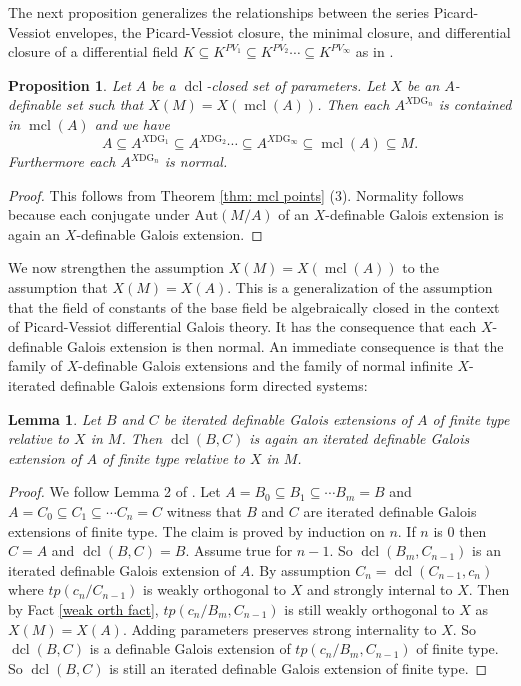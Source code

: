 \documentclass{amsart}
\newtheorem{proposition}[theorem]{Proposition}
\newtheorem{lemma}[theorem]{Lemma}
\theoremstyle{definition}
\theoremstyle{remark}
\numberwithin{equation}{section}
\def \tp {tp}
\def \aut {\text{Aut}}
\def \mcl {\operatorname{mcl}}
\def \dcl {\operatorname{dcl}}
\begin{document}
The next proposition generalizes the relationships between the series Picard-Vessiot envelopes, the Picard-Vessiot closure, the minimal closure, and differential closure of a differential field $K \subseteq K^{PV_1} \subseteq K^{PV_2}  \cdots \subseteq  K^{PV_\infty}$ as in \cite{meretzky2026galoistheoryautomorphismgroups}. 

\begin{proposition}\label{prop: struct of M}
    Let $A$ be a $\dcl$-closed set of parameters. Let $X$ be an $A$-definable set such that $X(M) = X(\mcl(A))$. Then each $A^{X\text{DG}_n}$ is contained in $\mcl(A)$ and we have $$A \subseteq A^{X\text{DG}_1} \subseteq A^{X\text{DG}_2} \cdots \subseteq A^{X\text{DG}_\infty} \subseteq \mcl(A) \subseteq M.$$ Furthermore each $A^{X\text{DG}_n}$ is normal. 
\end{proposition}

\begin{proof}
    This follows from Theorem \ref{thm: mcl points} (3). Normality follows because each conjugate under $\aut(M/A)$ of an $X$-definable Galois extension is again an $X$-definable Galois extension.
\end{proof}



We now strengthen the assumption $X(M)=X(\mcl(A))$ to the assumption that $X(M)=X(A)$. This is a generalization of the assumption that the field of constants of the base field be algebraically closed in the context of Picard-Vessiot differential Galois theory. It has the consequence that each $X$-definable Galois extension is then normal. An immediate consequence is that the family of $X$-definable Galois extensions and the family of normal infinite $X$-iterated definable Galois extensions form directed systems:

\begin{lemma}\label{lem: IDG form directed system}
    Let $B$ and $C$ be iterated definable Galois extensions of $A$ of finite type relative to $X$ in $M$. Then $\dcl(B,C)$ is again an iterated definable Galois extension of $A$ of finite type relative to $X$ in $M$.
\end{lemma}

\begin{proof}
    We follow Lemma 2 of \cite{magid2022completepicardvessiotclosure}. Let $A=B_0 \subseteq B_1 \subseteq \cdots B_m=B$ and $A=C_0 \subseteq C_1 \subseteq \cdots C_n=C$ witness that $B$ and $C$ are iterated definable Galois extensions of finite type. The claim is proved by induction on $n$. If $n$ is $0$ then $C=A$ and $\dcl(B,C) = B$. Assume true for $n-1$. So $\dcl(B_m,C_{n-1})$ is an iterated definable Galois extension of $A$. By assumption $C_n = \dcl(C_{n-1},c_n)$ where $tp(c_n/C_{n-1})$ is weakly orthogonal to $X$ and strongly internal to $X$. Then by Fact \ref{weak orth fact}, $\tp(c_n/B_m,C_{n-1})$ is still weakly orthogonal to $X$ as $X(M) = X(A)$. Adding parameters preserves strong internality to $X$. So $\dcl(B,C)$ is a definable Galois extension of $\tp(c_n/B_m,C_{n-1})$ of finite type. So $\dcl(B,C)$ is still an iterated definable Galois extension of finite type.
\end{proof}
\end{document}
